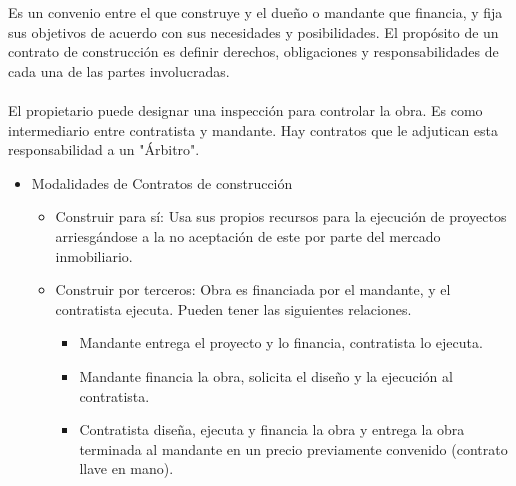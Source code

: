\documentclass{article} %
\begin{document}
Es un convenio entre el que construye y el dueño o mandante que financia, y fija sus objetivos
de acuerdo con sus necesidades y posibilidades. El propósito de un contrato de construcción
es definir derechos, obligaciones y responsabilidades de cada una de las partes involucradas.
\\ \\
El propietario puede designar una inspección para controlar la obra. Es como intermediario entre
contratista y mandante. Hay contratos que le adjutican esta responsabilidad a un "Árbitro".

\begin{itemize}[label={},left=0pt,align=parleft]
    \item \begin{highlightbox}[levelone] Modalidades de Contratos de construcción \end{highlightbox}
    \begin{itemize}[label={},left=1em,align=parleft]
        \item \begin{highlightbox}[leveltwo] Construir para sí: Usa sus propios recursos para la ejecución de proyectos arriesgándose a la no aceptación de este por parte del mercado inmobiliario. \end{highlightbox}
        \item \begin{highlightbox}[leveltwo] Construir por terceros: Obra es financiada por el mandante, y el contratista ejecuta. Pueden tener las siguientes relaciones. \end{highlightbox}
        \begin{itemize}[label={},left=2em,align=parleft]
            \item \begin{highlightbox}[levelthree] Mandante entrega el proyecto y lo financia, contratista lo ejecuta. \end{highlightbox}
            \item \begin{highlightbox}[levelthree] Mandante financia la obra, solicita el diseño y la ejecución al contratista. \end{highlightbox}
            \item \begin{highlightbox}[levelthree] Contratista diseña, ejecuta y financia la obra y entrega la obra terminada al mandante en un precio previamente convenido (contrato llave en mano). \end{highlightbox}

\end{itemize}
\end{itemize}
\end{itemize}
\end{document}
